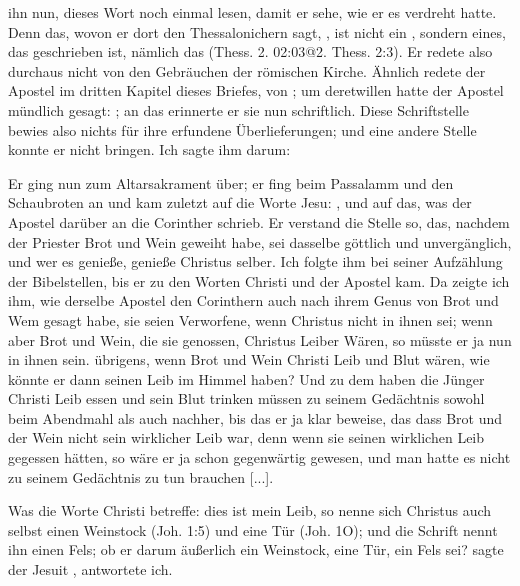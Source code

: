ihn nun, dieses Wort noch einmal lesen, damit er sehe, wie er es
verdreht hatte. Denn das, wovon er dort den Thessalonichern
sagt, , ist nicht ein 
, sondern eines, das geschrieben 
ist, nämlich das  (Thess. 2. 02:03@2. Thess. 2:3). 
Er redete also durchaus nicht von den Gebräuchen der römischen Kirche.
  Ähnlich redete
der Apostel im dritten Kapitel dieses Briefes, von ; um deretwillen hatte
der Apostel mündlich gesagt: ; an das erinnerte er sie nun schriftlich. 
Diese Schriftstelle
bewies also nichts für ihre erfundene Überlieferungen; und eine andere
Stelle konnte er nicht bringen. Ich sagte ihm darum: 

Er ging nun zum Altarsakrament über; er fing beim Passalamm
und den Schaubroten an und kam zuletzt auf die Worte Jesu:
, und auf das, was der Apostel darüber an
die Corinther schrieb. Er verstand die Stelle so, das, nachdem der
Priester Brot und Wein geweiht habe, sei dasselbe göttlich und
unvergänglich, und wer es genieße, genieße Christus selber. Ich
folgte ihm bei seiner Aufzählung der Bibelstellen, bis er zu den
Worten Christi und der Apostel kam. Da zeigte ich ihm, wie
derselbe Apostel den Corinthern auch nach ihrem Genus von Brot und
Wem gesagt habe, sie seien Verworfene, wenn Christus nicht in
ihnen sei; wenn aber Brot und Wein, die sie genossen, Christus
Leiber Wären, so müsste er ja nun in ihnen sein. übrigens, wenn
Brot und Wein Christi Leib und Blut wären, wie könnte er dann
seinen Leib im Himmel haben? Und zu dem haben die Jünger
Christi Leib essen und sein Blut trinken müssen zu seinem 
Gedächtnis sowohl beim Abendmahl als auch nachher, bis das er
ja klar beweise, das dass Brot und der Wein nicht
sein wirklicher Leib war, denn wenn sie seinen wirklichen Leib 
gegessen hätten, so wäre er ja schon gegenwärtig gewesen, und man
hatte es nicht zu seinem Gedächtnis zu tun brauchen [...].


Was die Worte Christi betreffe: dies ist mein Leib, so nenne
sich Christus auch selbst einen Weinstock 
(Joh. 1:5) und eine Tür
(Joh. 1O); und die Schrift nennt ihn einen Fels; 
ob er darum
äußerlich ein Weinstock, eine Tür, ein Fels sei?   sagte der
Jesuit  , antwortete ich.


